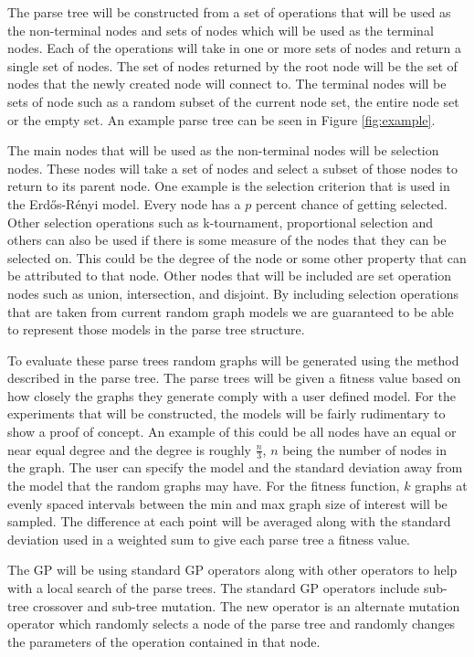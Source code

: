 \documentclass{article}
\begin{document}
The parse tree will be constructed from a set of operations that will be used as the non-terminal nodes and sets of nodes which will be used as the terminal nodes.  Each of the operations will take in one or more sets of nodes and return a single set of nodes. The set of nodes returned by the root node will be the set of nodes that the newly created node will connect to. The terminal nodes will be sets of node such as a random subset of the current node set, the entire node set or the empty set. An example parse tree can be seen in Figure \ref{fig:example}.

The main nodes that will be used as the non-terminal nodes will be selection nodes. These nodes will take a set of nodes and select a subset of those nodes to return to its parent node. One example is the selection criterion that is used in the Erd\H{o}s-R\'{e}nyi model. Every node has a $p$ percent chance of getting selected.  Other selection operations such as k-tournament, proportional selection and others can also be used if there is some measure of the nodes that they can be selected on. This could be the degree of the node or some other property that can be attributed to that node.  Other nodes that will be included are set operation nodes such as union, intersection, and disjoint.  By including selection operations that are taken from current random graph models we are guaranteed to be able to represent those models in the parse tree structure.

To evaluate these parse trees random graphs will be generated using the method described in the parse tree. The parse trees will be given a fitness value based on how closely the graphs they generate comply with a user defined model. For the experiments that will be constructed, the models will be fairly rudimentary to show a proof of concept. An example of this could be all nodes have an equal or near equal degree and the degree is roughly $\frac{n}{3}$, $n$ being the number of nodes in the graph.  The user can specify the model and the standard deviation away from the model that the random graphs may have. For the fitness function, $k$ graphs at evenly spaced intervals between the min and max graph size of interest will be sampled. The difference at each point will be averaged along with the standard deviation used in a weighted sum to give each parse tree a fitness value.

The GP will be using standard GP operators along with other operators to help with a local search of the parse trees. The standard GP operators include sub-tree crossover and sub-tree mutation. The new operator is an alternate mutation operator which randomly selects a node of the parse tree and randomly changes the parameters of the operation contained in that node.




 
\end{document}
